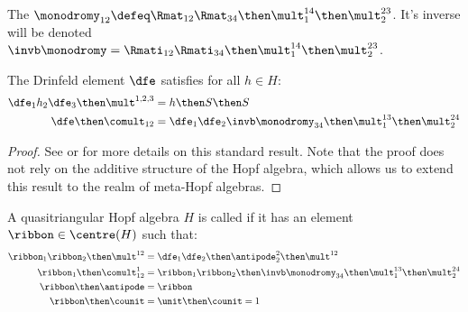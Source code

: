 \begin{definition}[monodromy]
        The 
        $\monodromy_{12} \defeq
        \Rmat_{12}\Rmat_{34}\then\mult^{14}_{1}\then\mult^{23}_{2}$. It's
        inverse will be denoted
        $\invb\monodromy =
        \Rmati_{12}\Rmati_{34}\then\mult^{14}_{1}\then\mult^{23}_{2}$.
\end{definition}

\begin{lemma}
        The Drinfeld element $\dfe$ satisfies for all $h\in H$:
        \begin{align}
                \dfe_{1}h_2\dfe_{3} \then \mult^{1,2,3}
                &= h \then S \then S\\
                \dfe \then \comult_{12} 
                &= \dfe_1\dfe_2\invb\monodromy_{34}
                \then\mult^{13}_{1}\then\mult^{24}_2
        \end{align}
\end{lemma}
\begin{proof}
        See \cite{SM} or \cite{ES} %
        for more details on this standard result. Note that the proof does not
        rely on the additive structure of the Hopf algebra, which allows us to
        extend this result to the realm of meta-Hopf algebras.
\end{proof}

\begin{definition}
        A quasitriangular Hopf algebra $H$ is called  if it has an
        element $\ribbon\in \centre(H)$ such that:
        \begin{align}
                \ribbon_1\ribbon_2\then\mult^{12}
                &= \dfe_1 \dfe_2 \then \antipode^{2}_{2} \then \mult^{12}\\
                \ribbon_1 \then \comult^1_{12}
                &=      \ribbon_1\ribbon_2
                        \then\invb\monodromy_{34}
                        \then\mult^{13}_{1}
                        \then\mult^{24}_{2} \\
                \ribbon \then \antipode &= \ribbon\\
                \ribbon \then \counit &= \unit \then \counit = 1
        \end{align}
\end{definition}

